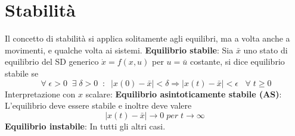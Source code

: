 \section{Stabilità}
Il concetto di stabilità si applica solitamente agli equilibri, ma a volta anche a movimenti, e qualche volta ai sistemi.\newline
\newline
\textbf{Equilibrio stabile}:\newline
Sia $\bar{x}$ uno stato di equilibrio del SD generico $\dot{x} = f(x,u)$ per $u = \bar{u}$ costante, si dice equilibrio stabile se
\[
    \;\forall\; \epsilon > 0 \;\; \exists \; \delta > 0 \;\;:\;\; |x(0) - \bar{x}| < \delta \Rightarrow  |x(t) - \bar{x}| < \epsilon \;\;\;\forall\;t \geq 0
\]
Interpretazione con $x$ scalare:\newline
\newline
\textbf{Equilibrio asintoticamente stabile (AS)}:\newline
L'equilibrio deve essere stabile e inoltre deve valere
\[
    |x(t) - \bar{x}| \rightarrow 0  \;per \; t \rightarrow \infty
\]
\newline
\textbf{Equilibrio instabile}:\newline
In tutti gli altri casi.

